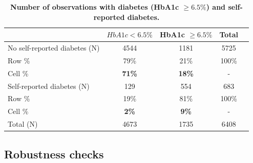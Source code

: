 \documentclass[12pt,english]{article}
\begin{document}
\begin{table}[!ht]
\begin{center}
\begin{adjustbox}{max width=\linewidth}
\begin{threeparttable}
{\begin{tablenotes}
					\end{tablenotes}
				}
			\end{threeparttable}
		\end{adjustbox}
	\end{center}
\end{table}

\clearpage

\begin{table}[!ht]
	\caption{\label{tab:Biomarker_observations}{\bf Number of observations with diabetes (HbA1c $\geq 6.5\%$) and self-reported diabetes.}}
	\begin{center}
		\begin{adjustbox}{max width=\linewidth}
			\begin{threeparttable}
				{
					\def\sym#1{\ifmmode^{#1}\else\(^{#1}\)\fi}
					\begin{tabular}{lcccc}
						\toprule
						&\multicolumn{1}{c}{$HbA1c < 6.5\%$}&\multicolumn{1}{c}{HbA1c $\geq 6.5\%$}&\multicolumn{1}{c}{Total}\\
						\midrule
						No self-reported diabetes (N) & 4544 & 1181 & 5725 &  \\
						\hspace*{10mm}Row  \% & 79\% & 21\% & 100\% &  \\
						\hspace*{10mm}Cell \% & \textbf{71\%} & \textbf{18\%} & - & \\
						Self-reported diabetes (N) & 129 & 554 & 683 &  \\
						\hspace*{10mm}Row \%  & 19\% & 81\% & 100\% &  \\
						\hspace*{10mm}Cell \% & \textbf{2\%} &\textbf{9\%} &- & \\
						Total (N) & 4673 & 1735 & 6408 &  \\ 
						\bottomrule
					\end{tabular}
					\begin{tablenotes}
						\item
					\end{tablenotes}
				}
			\end{threeparttable}
		\end{adjustbox}
	\end{center}
\end{table}


\clearpage

\subsection*{Robustness checks}
\end{document}
